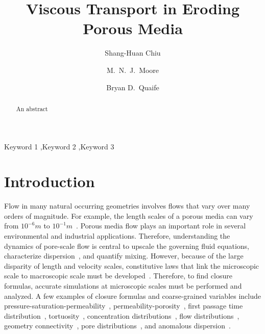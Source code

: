 \documentclass[preprint, 10pt]{elsarticle}
\begin{document}
\title{Viscous Transport in Eroding Porous Media}



\author[SH]{Shang-Huan Chiu}
\author[Nick]{M.~N.~J.~Moore}
\author[Bryan]{Bryan D.~Quaife}

\address[SH]{Department of Scientific Computing, Florida State
University, Tallahassee, FL, 32306.}
\address[Nick]{Department of Mathematics and Geophysical Fluid Dynamics
Institute, Florida State University, Tallahassee, FL, 32306.}
\address[Bryan]{Department of Scientific Computing and Geophysical Fluid
Dynamics Institute, Florida State University, Tallahassee, FL, 32306.}

\begin{abstract} 
  An abstract
\end{abstract}

\begin{keyword}
  Keyword 1 \sep Keyword 2 \sep Keyword 3 
\end{keyword}

\maketitle

\section{Introduction}
\label{sec:intro}
Flow in many natural occurring geometries involves flows that vary over
many orders of magnitude.  
For example, the length scales of a porous
media can vary from $10^{-6}m$ to
$10^{-1}m$~\cite{mil-chr-imh-mcb-ped1998}.  Porous media flow plays an
important role in several environmental and industrial applications.
Therefore, understanding the dynamics of pore-scale flow is central to
upscale the governing fluid equations, characterize
dispersion~\cite{saf1959}, and quantify mixing. However, because of the
large disparity of length and velocity scales, constitutive laws that
link the microscopic scale to macroscopic scale must be
developed~\cite{mil-chr-imh-mcb-ped1998}.  Therefore, to find closure
formulas, accurate simulations at microscopic scales must be performed
and analyzed.  A few examples of closure formulas and coarse-grained
variables include
pressure-saturation-permeability~\cite{mil-chr-imh-mcb-ped1998},
permeability-porosity~\cite{dar-mcc1998, car1937, won-kop-tom1984},
first passage time distribution~\cite{ber-sch-sil2000,
hym-den-hag-kan2019, cve-che-wen1996}, tortuosity~\cite{hak-com-den2019,
mat-kha-koz2008, dud-koz-mat2011, kop-kat-tim1996}, concentration
distributions~\cite{ica-den2019, bel-sal-rin1992}, flow
distributions~\cite{ali-par-wei-bre2017}, geometry
connectivity~\cite{knu-car2005, wes-blo-gra2001}, pore
distributions~\cite{ali-par-wei-bre2017}, and anomalous
dispersion~\cite{dea-qua-bir-jua2018, den-cor-sch-ber2004,
sie-ili-pri-riv-gua2019}.
\end{document}
